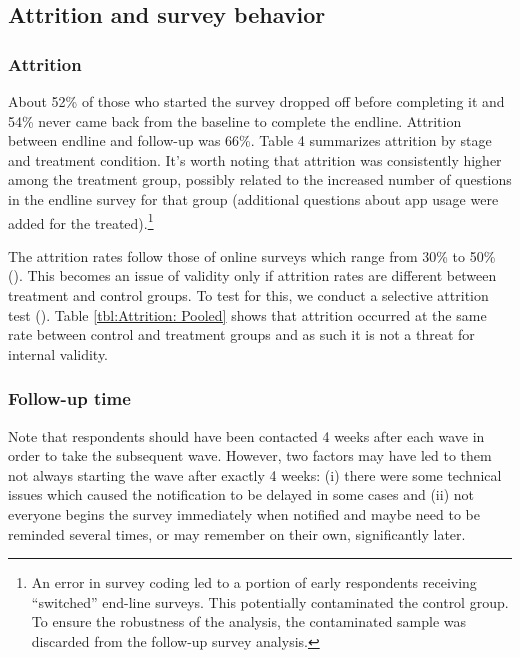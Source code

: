 \documentclass{article}
\begin{document}
\subsection{Attrition and survey behavior}

\subsubsection*{Attrition}

About 52\% of those who started the survey dropped off before completing it and 54\% never came back from the baseline to complete the endline. Attrition between endline and follow-up was 66\%. Table 4 summarizes attrition by stage and treatment condition. It’s worth noting that attrition was consistently higher among the treatment group, possibly related to the increased number of questions in the endline survey for that group (additional questions about app usage were added for the treated).\footnote{An error in survey coding led to a portion of early respondents receiving “switched” end-line surveys. This potentially contaminated the control group. To ensure the robustness of the analysis, the contaminated sample was discarded from the follow-up survey analysis.}

The attrition rates follow those of online surveys which range from 30\% to 50\% (\cite{zhou2016pitfall}). This becomes an issue of validity only if attrition rates are different between treatment and control groups. To test for this, we conduct a selective attrition test (\cite{ghanem2023testing}). Table \ref{tbl:Attrition: Pooled} shows that attrition occurred at the same rate between control and treatment groups and as such it is not a threat for internal validity.





\subsubsection*{Follow-up time}
Note that respondents should have been contacted 4 weeks after each wave in order to take the subsequent wave. However, two factors may have led to them not always starting the wave after exactly 4 weeks: (i) there were some technical issues which caused the notification to be delayed in some cases and (ii) not everyone begins the survey immediately when notified and maybe need to be reminded several times, or may remember on their own, significantly later.
\end{document}
